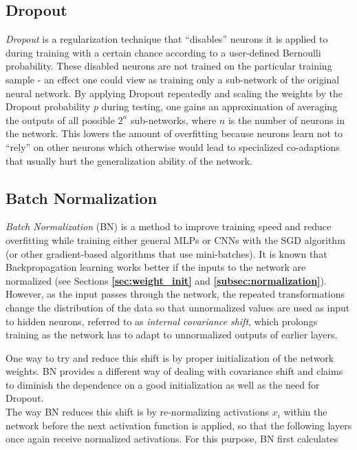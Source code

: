 	\subsection {Dropout}
\label{subsec:dropout}
\textit{Dropout} is a regularization technique \cite{dropout} that ``disables'' neurons it is applied to during training with a certain chance according to a user-defined Bernoulli probability. These disabled neurons are not trained on the particular training sample - an effect one could view as training only a sub-network of the original neural network. By applying Dropout repeatedly and scaling the weights by the Dropout probability $p$ during testing, one gains an approximation of averaging the outputs of all possible $2^n$ sub-networks, where $n$ is the number of neurons in the network. This lowers the amount of overfitting because neurons learn not to ``rely'' on other neurons which otherwise would lead to specialized co-adaptions that usually hurt the generalization ability of the network.



	\subsection {Batch Normalization}
\label{subsec:batchnorm}
\textit{Batch Normalization} (BN) \cite{batchnorm, batchnorm_pres} is a method to improve training speed and reduce overfitting while training either general MLPs or CNNs with the SGD algorithm (or other gradient-based algorithms that use mini-batches). It is known that Backpropagation learning works better if the inputs to the network are normalized (see Sections \textbf{\ref{sec:weight_init}} and \textbf{\ref{subsec:normalization}}). However, as the input passes through the network, the repeated transformations change the distribution of the data so that unnormalized values are used as input to hidden neurons, referred to as \textit{internal covariance shift}, which prolongs training as the network has to adapt to unnormalized outputs of earlier layers.

One way to try and reduce this shift is by proper initialization of the network weights. BN provides a different way of dealing with covariance shift and claims to diminish the dependence on a good initialization as well as the need for Dropout.\\

The way BN reduces this shift is by re-normalizing activations $x_i$ within the network before the next activation function is applied, so that the following layers once again receive normalized activations. For this purpose, BN first calculates

